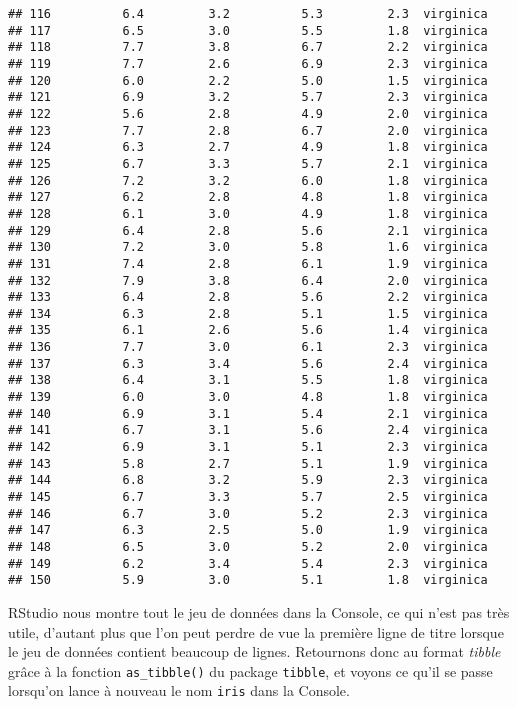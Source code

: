 \documentclass[
  french,
]{book}
\begin{document}
\begin{verbatim}
## 116          6.4         3.2          5.3         2.3  virginica
## 117          6.5         3.0          5.5         1.8  virginica
## 118          7.7         3.8          6.7         2.2  virginica
## 119          7.7         2.6          6.9         2.3  virginica
## 120          6.0         2.2          5.0         1.5  virginica
## 121          6.9         3.2          5.7         2.3  virginica
## 122          5.6         2.8          4.9         2.0  virginica
## 123          7.7         2.8          6.7         2.0  virginica
## 124          6.3         2.7          4.9         1.8  virginica
## 125          6.7         3.3          5.7         2.1  virginica
## 126          7.2         3.2          6.0         1.8  virginica
## 127          6.2         2.8          4.8         1.8  virginica
## 128          6.1         3.0          4.9         1.8  virginica
## 129          6.4         2.8          5.6         2.1  virginica
## 130          7.2         3.0          5.8         1.6  virginica
## 131          7.4         2.8          6.1         1.9  virginica
## 132          7.9         3.8          6.4         2.0  virginica
## 133          6.4         2.8          5.6         2.2  virginica
## 134          6.3         2.8          5.1         1.5  virginica
## 135          6.1         2.6          5.6         1.4  virginica
## 136          7.7         3.0          6.1         2.3  virginica
## 137          6.3         3.4          5.6         2.4  virginica
## 138          6.4         3.1          5.5         1.8  virginica
## 139          6.0         3.0          4.8         1.8  virginica
## 140          6.9         3.1          5.4         2.1  virginica
## 141          6.7         3.1          5.6         2.4  virginica
## 142          6.9         3.1          5.1         2.3  virginica
## 143          5.8         2.7          5.1         1.9  virginica
## 144          6.8         3.2          5.9         2.3  virginica
## 145          6.7         3.3          5.7         2.5  virginica
## 146          6.7         3.0          5.2         2.3  virginica
## 147          6.3         2.5          5.0         1.9  virginica
## 148          6.5         3.0          5.2         2.0  virginica
## 149          6.2         3.4          5.4         2.3  virginica
## 150          5.9         3.0          5.1         1.8  virginica
\end{verbatim}

RStudio nous montre tout le jeu de données dans la Console, ce qui n'est pas très utile, d'autant plus que l'on peut perdre de vue la première ligne de titre lorsque le jeu de données contient beaucoup de lignes. Retournons donc au format \emph{tibble} grâce à la fonction \texttt{as\_tibble()} du package \texttt{tibble}, et voyons ce qu'il se passe lorsqu'on lance à nouveau le nom \texttt{iris} dans la Console.
\end{document}
